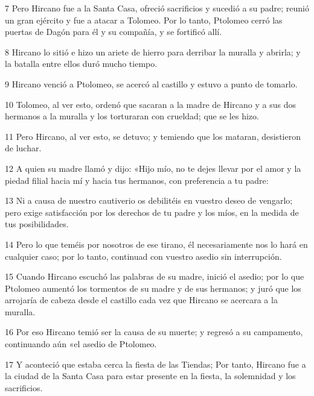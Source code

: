 \par 7 Pero Hircano fue a la Santa Casa, ofreció sacrificios y sucedió a su padre; reunió un gran ejército y fue a atacar a Tolomeo. Por lo tanto, Ptolomeo cerró las puertas de Dagón para él y su compañía, y se fortificó allí.

\par 8 Hircano lo sitió e hizo un ariete de hierro para derribar la muralla y abrirla; y la batalla entre ellos duró mucho tiempo.

\par 9 Hircano venció a Ptolomeo, se acercó al castillo y estuvo a punto de tomarlo.

\par 10 Tolomeo, al ver esto, ordenó que sacaran a la madre de Hircano y a sus dos hermanos a la muralla y los torturaran con crueldad; que se les hizo.

\par 11 Pero Hircano, al ver esto, se detuvo; y temiendo que los mataran, desistieron de luchar.

\par 12 A quien su madre llamó y dijo: «Hijo mío, no te dejes llevar por el amor y la piedad filial hacia mí y hacia tus hermanos, con preferencia a tu padre:

\par 13 Ni a causa de nuestro cautiverio os debilitéis en vuestro deseo de vengarlo; pero exige satisfacción por los derechos de tu padre y los míos, en la medida de tus posibilidades.

\par 14 Pero lo que teméis por nosotros de ese tirano, él necesariamente nos lo hará en cualquier caso; por lo tanto, continuad con vuestro asedio sin interrupción.

\par 15 Cuando Hircano escuchó las palabras de su madre, inició el asedio; por lo que Ptolomeo aumentó los tormentos de su madre y de sus hermanos; y juró que los arrojaría de cabeza desde el castillo cada vez que Hircano se acercara a la muralla.

\par 16 Por eso Hircano temió ser la causa de su muerte; y regresó a su campamento, continuando aún «el asedio de Ptolomeo.

\par 17 Y aconteció que estaba cerca la fiesta de las Tiendas; Por tanto, Hircano fue a la ciudad de la Santa Casa para estar presente en la fiesta, la solemnidad y los sacrificios.

